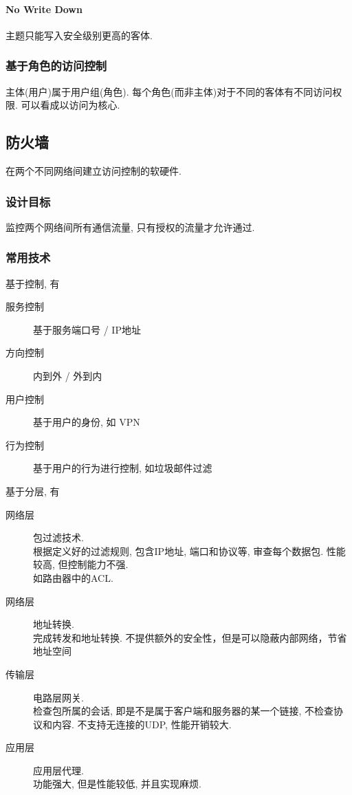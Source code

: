 \documentclass{ctexart}
\begin{document}
\paragraph{No Write Down}
    主题只能写入安全级别更高的客体.
\subsubsection{基于角色的访问控制}
    主体(用户)属于用户组(角色). 每个角色(而非主体)对于不同的客体有不同访问权限.
    可以看成以访问为核心.

\subsection{防火墙}
    在两个不同网络间建立访问控制的软硬件.
\subsubsection{设计目标}
    监控两个网络间所有通信流量, 只有授权的流量才允许通过.
\subsubsection{常用技术} 基于控制, 有\begin{description}
        \item[服务控制] 基于服务端口号 / IP地址
        \item[方向控制] 内到外 / 外到内
        \item[用户控制] 基于用户的身份, 如 VPN
        \item[行为控制] 基于用户的行为进行控制, 如垃圾邮件过滤
    \end{description}\par
    基于分层, 有\begin{description}
        \item[网络层] 包过滤技术.\\
            根据定义好的过滤规则, 包含IP地址, 端口和协议等, 审查每个数据包. 性能较高, 但控制能力不强.\\
            如路由器中的ACL.
        \item[网络层] 地址转换.\\
            完成转发和地址转换. 不提供额外的安全性，但是可以隐蔽内部网络，节省地址空间
        \item[传输层] 电路层网关.\\
            检查包所属的会话, 即是不是属于客户端和服务器的某一个链接, 不检查协议和内容.
            不支持无连接的UDP, 性能开销较大.
        \item[应用层] 应用层代理.\\
            功能强大, 但是性能较低, 并且实现麻烦.
    \end{description}
\end{document}
